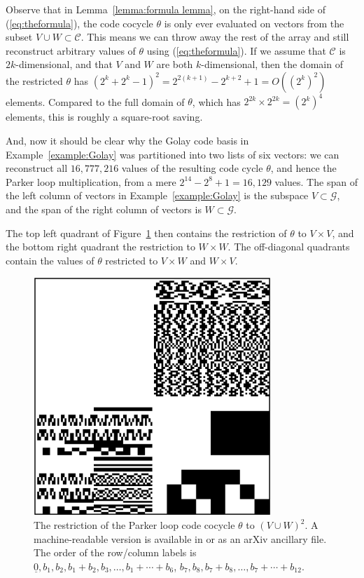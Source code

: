 \documentclass{article}
\theoremstyle{plain}
\theoremstyle{definition}
\def \cC {\mathcal{C}}
\def \cG {\mathcal{G}}
\begin{document}
Observe that in Lemma~\ref{lemma:formula lemma}, on the right-hand side of (\ref{eq:theformula}), the code cocycle $\theta$ is only ever evaluated on vectors from the subset $V \cup W \subset \cC$.
This means we can throw away the rest of the array and still reconstruct arbitrary values of $\theta$ using (\ref{eq:theformula}).
If we assume that $\cC$ is $2k$-dimensional, and that $V$ and $W$ are both $k$-dimensional, then the domain of the restricted $\theta$ has $(2^k+2^k - 1)^2 = 2^{2(k+1)} - 2^{k+2} + 1 = O((2^k)^2)$ elements. 
Compared to the full domain of $\theta$, which has $2^{2k}\times 2^{2k} = (2^k)^4$ elements, this is roughly a square-root saving.

And, now it should be clear why the Golay code basis in Example~\ref{example:Golay} was partitioned into two lists of six vectors: we can reconstruct all $16,777,216$ values of the resulting code cycle $\theta$, and hence the Parker loop multiplication, from a mere $2^{14} - 2^8 + 1 = 16,129$ values.
The span of the left column of vectors in Example~\ref{example:Golay} is the subspace $V\subset \cG$, and the span of the right column of vectors is $W\subset \cG$.

The top left quadrant of Figure~\ref{fig:Parker cocycle} then contains the restriction of $\theta$ to $V\times V$, and the bottom right quadrant the restriction to $W\times W$. 
The off-diagonal quadrants contain the values of $\theta$ restricted to $V\times W$ and $W\times V$.

\begin{figure}[ht]
\begin{center}
\includegraphics[width=0.8\textwidth]{alpha_awesum.png}
\end{center}
\caption{The restriction of the Parker loop code cocycle $\theta$ to $(V\cup W)^2$. A machine-readable version is available in \cite{RN_GH} or as an arXiv ancillary file. The order of the row/column labels is $\underline{0},b_1,b_2,b_1+b_2,b_3,\ldots, b_1+\cdots +b_6$, $b_7,b_8,b_7+b_8,\ldots,b_7+\cdots + b_{12}$.}
\label{fig:Parker cocycle}
\end{figure}
\end{document}
